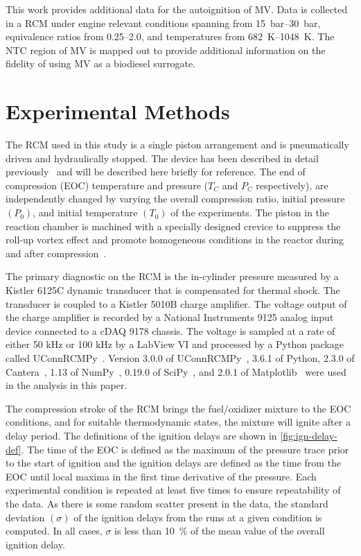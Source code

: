 \documentclass[letterpaper, review]{elsarticle}
\begin{document}
This work provides additional data for the autoignition of MV. Data is collected in a RCM under
engine relevant conditions spanning from \SIrange{15}{30}{\bar}, equivalence ratios from
\numrange{0.25}{2.0}, and temperatures from \SIrange{682}{1048}{\K}. The NTC region of MV is mapped
out to provide additional information on the fidelity of using MV as a biodiesel surrogate.

\section{Experimental Methods}\label{sec:experimental-methods}

The RCM used in this study is a single piston arrangement and is pneumatically driven and
hydraulically stopped. The device has been described in detail previously~\cite{Mittal2007a} and
will be described here briefly for reference. The end of compression (EOC) temperature and pressure
(\(T_C\) and \(P_C\) respectively), are independently changed by varying the overall compression
ratio, initial pressure \((P_0)\), and initial temperature \((T_0)\) of the experiments. The piston
in the reaction chamber is machined with a specially designed crevice to suppress the roll-up vortex
effect and promote homogeneous conditions in the reactor during and after
compression~\cite{Mittal2006}.

The primary diagnostic on the RCM is the in-cylinder pressure measured by a Kistler 6125C dynamic
transducer that is compensated for thermal shock. The transducer is coupled to a Kistler 5010B
charge amplifier. The voltage output of the charge amplifier is recorded by a National Instruments
9125 analog input device connected to a cDAQ 9178 chassis. The voltage is sampled at a rate of
either  50 kHz or 100 kHz by a LabView VI and processed by a Python package called
UConnRCMPy~\cite{Weber2016a}. Version 3.0.0 of UConnRCMPy~\cite{uconnrcmpy}, 3.6.1 of Python, 2.3.0
of Cantera~\cite{cantera}, 1.13 of NumPy~\cite{vanderWalt2011}, 0.19.0 of SciPy~\cite{Jones2001},
and 2.0.1 of Matplotlib~\cite{Hunter2007} were used in the analysis in this paper.

The compression stroke of the RCM brings the fuel/oxidizer mixture to the EOC conditions, and for
suitable thermodynamic states, the mixture will ignite after a delay period. The definitions of the
ignition delays are shown in \cref{fig:ign-delay-def}. The time of the EOC is defined as the maximum
of the pressure trace prior to the start of ignition and the ignition delays are defined as the time
from the EOC until local maxima in the first time derivative of the pressure. Each experimental
condition is repeated at least five times to ensure repeatability of the data. As there is some
random scatter present in the data, the standard deviation \((\sigma)\) of the ignition delays from
the runs at a given condition is computed. In all cases, \(\sigma\) is less than \SI{10}{\percent}
of the mean value of the overall ignition delay.
\end{document}
